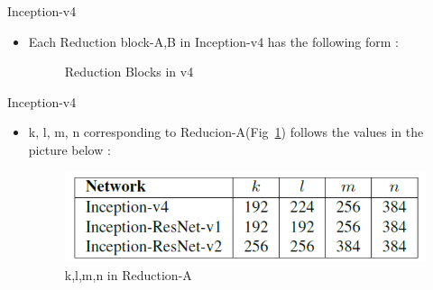 \documentclass{beamer}
\begin{document}
\begin{frame}{Inception-v4}
	\begin{itemize}
		\item Each Reduction block-A,B in Inception-v4 has the following form :
		\vspace{10pt}
		\begin{figure}[h]		
			\centering
			\quad
			\caption{Reduction Blocks in v4}
			\label{Reduction Blocks v4}
		\end{figure}
	\end{itemize}
\end{frame}


\begin{frame}{Inception-v4}
	\begin{itemize}
		\item k, l, m, n corresponding to Reducion-A(Fig~\ref{Reduction Blocks v4}) follows the values in the picture below :
		\vspace{13pt}
		\begin{figure}[h]		
			\centering
			\includegraphics[scale=0.4]{./v4/klmn.PNG}
			\caption{k,l,m,n in Reduction-A}
			\label{klmn}
		\end{figure}
	\end{itemize}
\end{frame}
\end{document}
